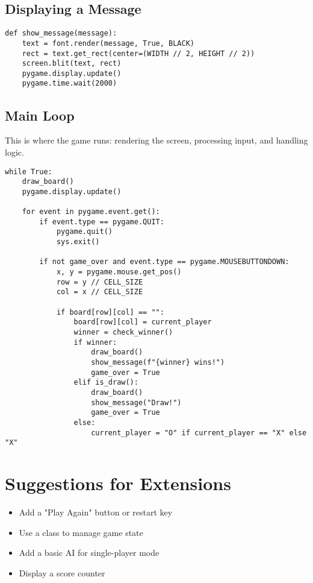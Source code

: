 \documentclass{article}
\begin{document}
\subsection{Displaying a Message}

\begin{lstlisting}[style=pythonstyle]
def show_message(message):
    text = font.render(message, True, BLACK)
    rect = text.get_rect(center=(WIDTH // 2, HEIGHT // 2))
    screen.blit(text, rect)
    pygame.display.update()
    pygame.time.wait(2000)
\end{lstlisting}

\newpage

\subsection{Main Loop}

This is where the game runs: rendering the screen, processing input, and handling logic.

\begin{lstlisting}[style=pythonstyle]
while True:
    draw_board()
    pygame.display.update()

    for event in pygame.event.get():
        if event.type == pygame.QUIT:
            pygame.quit()
            sys.exit()

        if not game_over and event.type == pygame.MOUSEBUTTONDOWN:
            x, y = pygame.mouse.get_pos()
            row = y // CELL_SIZE
            col = x // CELL_SIZE

            if board[row][col] == "":
                board[row][col] = current_player
                winner = check_winner()
                if winner:
                    draw_board()
                    show_message(f"{winner} wins!")
                    game_over = True
                elif is_draw():
                    draw_board()
                    show_message("Draw!")
                    game_over = True
                else:
                    current_player = "O" if current_player == "X" else "X"
\end{lstlisting}

\section{Suggestions for Extensions}

\begin{itemize}
    \item Add a "Play Again" button or restart key
    \item Use a class to manage game state
    \item Add a basic AI for single-player mode
    \item Display a score counter
\end{itemize}
\end{document}
